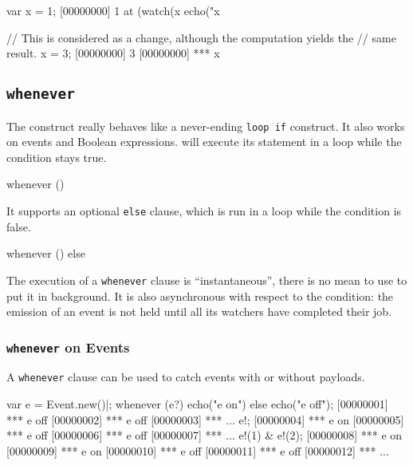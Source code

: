 \begin{urbiscript}[firstnumber=1]
var x = 1;
[00000000] 1
at (watch(x %
  echo("x %

// This is considered as a change, although the computation yields the
// same result.
x = 3;
[00000000] 3
[00000000] *** x %
\end{urbiscript}


\subsection{\lstinline{whenever}}
\label{sec:lang:whenever}

The  construct really behaves like a never-ending
\lstinline|loop if| construct.  It also works on events and Boolean
expressions.  will execute its statement in a loop
while the condition stays true.

\begin{urbiunchecked}
whenever ()
\end{urbiunchecked}

It supports an optional \lstinline{else} clause, which is run in a loop
while the condition is false.

\begin{urbiunchecked}
whenever ()
else
\end{urbiunchecked}

The execution of a \lstinline{whenever} clause is ``instantaneous'',
there is no mean to use \samp{,} to put it in background.  It is also
asynchronous with respect to the condition: the emission of an event
is not held until all its watchers have completed their job.

\subsubsection{\lstinline{whenever} on Events}

A \lstinline{whenever} clause can be used to catch events with or
without payloads.

\begin{urbiunchecked}[firstnumber=1]
var e = Event.new()|;
whenever (e?)
  echo("e on")
else
  echo("e off");
[00000001] *** e off
[00000002] *** e off
[00000003] *** ...
e!;
[00000004] *** e on
[00000005] *** e off
[00000006] *** e off
[00000007] *** ...
e!(1) & e!(2);
[00000008] *** e on
[00000009] *** e on
[00000010] *** e off
[00000011] *** e off
[00000012] *** ...
\end{urbiunchecked}

